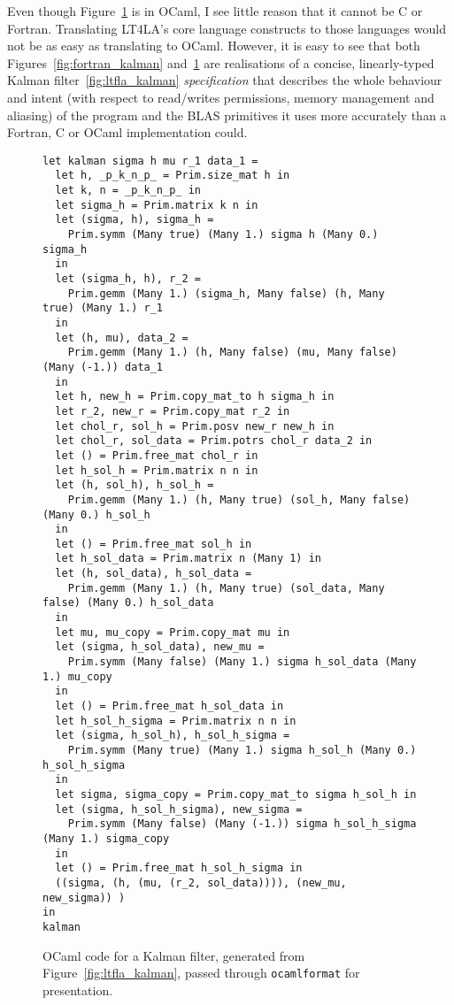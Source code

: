 Even though Figure~\ref{fig:ocaml_kalman} is in OCaml, I see little reason that
it cannot be C or Fortran. Translating LT4LA's core language constructs to
those languages would not be as easy as translating to OCaml. However, it is
easy to see that both Figures~\ref{fig:fortran_kalman}
and~\ref{fig:ocaml_kalman} are realisations of a concise, linearly-typed Kalman
filter~\ref{fig:ltfla_kalman} \emph{specification} that describes the whole
behaviour and intent (with respect to read/writes permissions, memory
management and aliasing) of the program and the BLAS primitives it uses more
accurately than a Fortran, C or OCaml implementation could.

\begin{figure}[p]
    \begin{verbatim}
let kalman sigma h mu r_1 data_1 =
  let h, _p_k_n_p_ = Prim.size_mat h in
  let k, n = _p_k_n_p_ in
  let sigma_h = Prim.matrix k n in
  let (sigma, h), sigma_h =
    Prim.symm (Many true) (Many 1.) sigma h (Many 0.) sigma_h
  in
  let (sigma_h, h), r_2 =
    Prim.gemm (Many 1.) (sigma_h, Many false) (h, Many true) (Many 1.) r_1
  in
  let (h, mu), data_2 =
    Prim.gemm (Many 1.) (h, Many false) (mu, Many false) (Many (-1.)) data_1
  in
  let h, new_h = Prim.copy_mat_to h sigma_h in
  let r_2, new_r = Prim.copy_mat r_2 in
  let chol_r, sol_h = Prim.posv new_r new_h in
  let chol_r, sol_data = Prim.potrs chol_r data_2 in
  let () = Prim.free_mat chol_r in
  let h_sol_h = Prim.matrix n n in
  let (h, sol_h), h_sol_h =
    Prim.gemm (Many 1.) (h, Many true) (sol_h, Many false) (Many 0.) h_sol_h
  in
  let () = Prim.free_mat sol_h in
  let h_sol_data = Prim.matrix n (Many 1) in
  let (h, sol_data), h_sol_data =
    Prim.gemm (Many 1.) (h, Many true) (sol_data, Many false) (Many 0.) h_sol_data
  in
  let mu, mu_copy = Prim.copy_mat mu in
  let (sigma, h_sol_data), new_mu =
    Prim.symm (Many false) (Many 1.) sigma h_sol_data (Many 1.) mu_copy
  in
  let () = Prim.free_mat h_sol_data in
  let h_sol_h_sigma = Prim.matrix n n in
  let (sigma, h_sol_h), h_sol_h_sigma =
    Prim.symm (Many true) (Many 1.) sigma h_sol_h (Many 0.) h_sol_h_sigma
  in
  let sigma, sigma_copy = Prim.copy_mat_to sigma h_sol_h in
  let (sigma, h_sol_h_sigma), new_sigma =
    Prim.symm (Many false) (Many (-1.)) sigma h_sol_h_sigma (Many 1.) sigma_copy
  in
  let () = Prim.free_mat h_sol_h_sigma in
  ((sigma, (h, (mu, (r_2, sol_data)))), (new_mu, new_sigma)) )
in
kalman
    \end{verbatim}
    \caption{OCaml code for a Kalman filter, generated from
        Figure~\ref{fig:ltfla_kalman}, passed through \texttt{ocamlformat} for
        presentation.}\label{fig:ocaml_kalman}

\end{figure}


